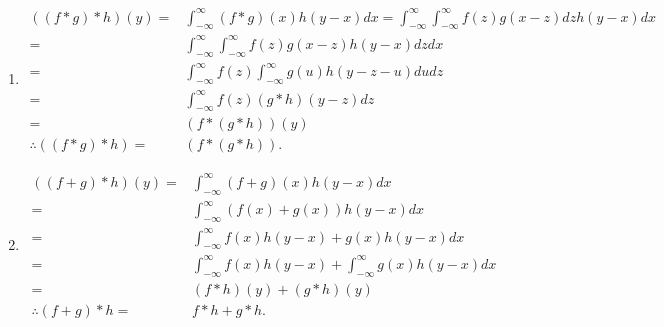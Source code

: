 \documentclass{article}
\begin{document}
\begin{enumerate}
\begin{enumerate}
\begin{enumerate}
						\item 
							$$
							\begin{aligned}
							((f*g)*h)(y) = & \int_{-\infty}^{\infty}(f*g)(x)h(y-x)dx =  \int_{-\infty}^{\infty}\int_{-\infty}^{\infty}f(z)g(x-z)dzh(y-x)dx
							\\
							= & \int_{-\infty}^{\infty}\int_{-\infty}^{\infty}f(z)g(x-z)h(y-x)dzdx
							\\
							= & \int_{-\infty}^{\infty}f(z)\int_{-\infty}^{\infty}g(u)h(y-z-u)dudz
							\\
							= & \int_{-\infty}^{\infty}f(z)(g*h)(y-z)dz
							\\
							= & 
							(f*(g*h))(y)
							\\
							\therefore ((f*g)*h) = & (f*(g*h)).
							\end{aligned}
							$$
							
							\item
							$$
							\begin{aligned}
							((f+g)*h)(y) = & \int_{-\infty}^{\infty}(f+g)(x)h(y-x)dx 
							\\
							= & \int_{-\infty}^{\infty}(f(x)+g(x))h(y-x)dx
							\\
							= & \int_{-\infty}^{\infty}f(x)h(y-x) + g(x)h(y-x)dx
							\\
							= & \int_{-\infty}^{\infty}f(x)h(y-x) + \int_{-\infty}^{\infty}g(x)h(y-x)dx
							\\
							= & (f*h)(y) + (g*h)(y)
							\\
							\therefore (f+g)*h = & f*h + g*h.
							\end{aligned}
							$$
							

\end{enumerate}
\end{enumerate}
\end{enumerate}
\end{document}

